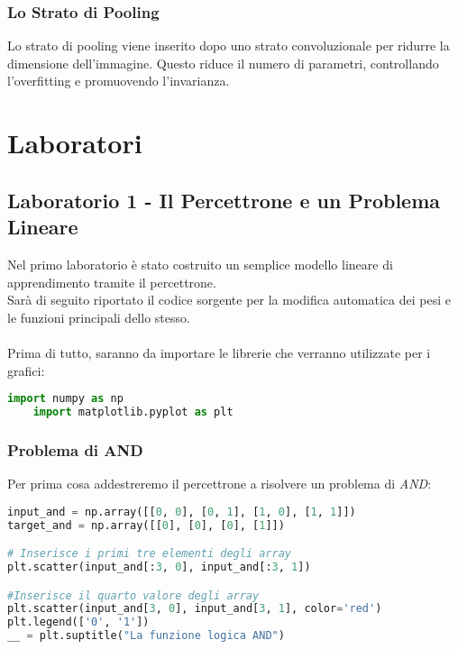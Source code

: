 \documentclass[12pt, a4paper]{article}
\begin{document}
\subsubsection{Lo Strato di Pooling}
Lo strato di pooling viene inserito dopo uno strato convoluzionale per ridurre la dimensione dell'immagine. Questo riduce il numero di parametri, controllando l'overfitting e promuovendo l'invarianza.

\section{Laboratori}
\subsection{Laboratorio 1 - Il Percettrone e un Problema Lineare}
Nel primo laboratorio è stato costruito un semplice modello lineare di apprendimento tramite il percettrone.\\
Sarà di seguito riportato il codice sorgente per la modifica automatica dei pesi e le funzioni principali dello stesso.\\
\\
Prima di tutto, saranno da importare le librerie che verranno utilizzate per i grafici:
\begin{lstlisting}[language=Python, caption=Importazione delle librerie]
    import numpy as np
    import matplotlib.pyplot as plt
\end{lstlisting}

\subsubsection{Problema di AND}
Per prima cosa addestreremo il percettrone a risolvere un problema di \textit{AND}:
\begin{lstlisting}[language=Python, caption=Inizializzazione]
input_and = np.array([[0, 0], [0, 1], [1, 0], [1, 1]])
target_and = np.array([[0], [0], [0], [1]])

# Inserisce i primi tre elementi degli array
plt.scatter(input_and[:3, 0], input_and[:3, 1]) 

#Inserisce il quarto valore degli array
plt.scatter(input_and[3, 0], input_and[3, 1], color='red')
plt.legend(['0', '1'])
__ = plt.suptitle("La funzione logica AND")
\end{lstlisting}
\end{document}
